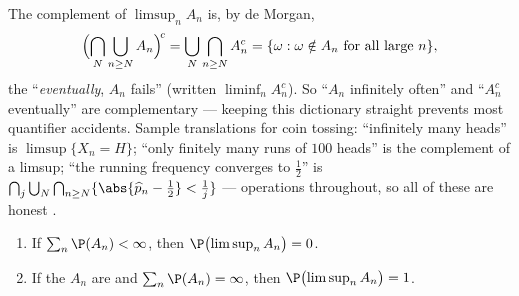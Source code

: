 \begin{example}\label{ex:b2:proba:limsuplang}
The complement of $\limsup_nA_n$ is, by de Morgan,
\[
\Bigl(\bigcap_N\bigcup_{n\geq N}A_n\Bigr)^{\!c}
= \bigcup_N\bigcap_{n\geq N}A_n^c
= \{\omega : \omega \notin A_n \text{ for all large }n\},
\]
the  ``\emph{eventually}, $A_n$ fails'' (written
$\liminf_nA_n^c$). So ``$A_n$ infinitely often'' and
``$A_n^c$ eventually'' are complementary --- keeping this
dictionary straight prevents most quantifier accidents.
Sample translations for coin tossing: ``infinitely many
heads'' is $\limsup\{X_n = H\}$; ``only finitely many runs
of $100$ heads'' is the complement of a limsup; ``the
running frequency converges to $\frac12$'' is
$\bigcap_j\bigcup_N\bigcap_{n\geq N}\{\abs{\widehat p_n -
\tfrac12} < \tfrac1j\}$ ---  operations throughout,
so all of these are honest .
\end{example}

\begin{theorem}\label{thm:b2:proba:borelcantelli}
\leavevmode
\begin{enumerate}
\item If $\sum_{n} \P(A_n) < \infty$, then
$\P\bigl(\limsup_n A_n\bigr) = 0$.
\item If the  $A_n$ are  and $\sum_n \P(A_n) =
\infty$, then $\P\bigl(\limsup_n A_n\bigr) = 1$.
\end{enumerate}
\end{theorem}

